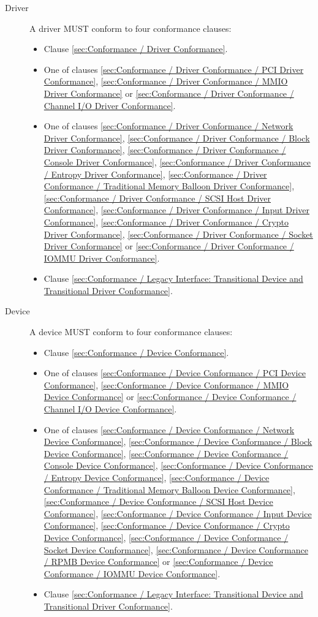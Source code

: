 \begin{description}
\item[Driver] A driver MUST conform to four conformance clauses:
  \begin{itemize}
    \item Clause \ref{sec:Conformance / Driver Conformance}.
    \item One of clauses \ref{sec:Conformance / Driver Conformance / PCI Driver Conformance}, \ref{sec:Conformance / Driver Conformance / MMIO Driver Conformance} or \ref{sec:Conformance / Driver Conformance / Channel I/O Driver Conformance}.
    \item One of clauses
\ref{sec:Conformance / Driver Conformance / Network Driver Conformance},
\ref{sec:Conformance / Driver Conformance / Block Driver Conformance},
\ref{sec:Conformance / Driver Conformance / Console Driver Conformance},
\ref{sec:Conformance / Driver Conformance / Entropy Driver Conformance},
\ref{sec:Conformance / Driver Conformance / Traditional Memory Balloon Driver Conformance},
\ref{sec:Conformance / Driver Conformance / SCSI Host Driver Conformance},
\ref{sec:Conformance / Driver Conformance / Input Driver Conformance},
\ref{sec:Conformance / Driver Conformance / Crypto Driver Conformance},
\ref{sec:Conformance / Driver Conformance / Socket Driver Conformance} or
\ref{sec:Conformance / Driver Conformance / IOMMU Driver Conformance}.
    \item Clause \ref{sec:Conformance / Legacy Interface: Transitional Device and Transitional Driver Conformance}.
  \end{itemize}
\item[Device] A device MUST conform to four conformance clauses:
  \begin{itemize}
    \item Clause \ref{sec:Conformance / Device Conformance}.
    \item One of clauses \ref{sec:Conformance / Device Conformance / PCI Device Conformance}, \ref{sec:Conformance / Device Conformance / MMIO Device Conformance} or \ref{sec:Conformance / Device Conformance / Channel I/O Device Conformance}.
    \item One of clauses 
\ref{sec:Conformance / Device Conformance / Network Device Conformance}, 
\ref{sec:Conformance / Device Conformance / Block Device Conformance}, 
\ref{sec:Conformance / Device Conformance / Console Device Conformance}, 
\ref{sec:Conformance / Device Conformance / Entropy Device Conformance}, 
\ref{sec:Conformance / Device Conformance / Traditional Memory Balloon Device Conformance}, 
\ref{sec:Conformance / Device Conformance / SCSI Host Device Conformance}, 
\ref{sec:Conformance / Device Conformance / Input Device Conformance}, 
\ref{sec:Conformance / Device Conformance / Crypto Device Conformance}, 
\ref{sec:Conformance / Device Conformance / Socket Device Conformance}, 
\ref{sec:Conformance / Device Conformance / RPMB Device Conformance} or 
\ref{sec:Conformance / Device Conformance / IOMMU Device Conformance}.
    \item Clause \ref{sec:Conformance / Legacy Interface: Transitional Device and Transitional Driver Conformance}.
  \end{itemize}
\end{description}

